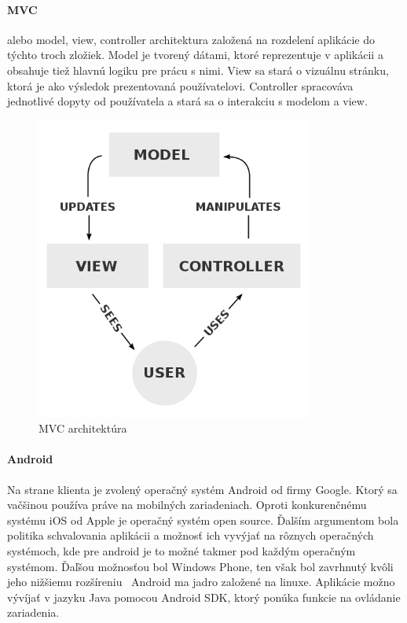 \paragraph{MVC} alebo model, view, controller architektura založená na rozdelení aplikácie do týchto troch zložiek. Model je tvorený dátami, ktoré reprezentuje v aplikácii a obsahuje tiež hlavnú logiku pre prácu s nimi. View sa stará o vizuálnu stránku, ktorá je ako výsledok prezentovaná používatelovi. Controller spracováva jednotlivé dopyty od používatela a stará sa o interakciu s modelom a view.
\begin{figure}[h]
  \centering
  \includegraphics[height=10cm]{mainmatter/imgs/mvc.png}
  \caption{MVC architektúra}
  \label{fig:comenius}
\end{figure}

\paragraph{Android} Na strane klienta je zvolený operačný systém Android od firmy Google. Ktorý sa vačšinou používa práve na mobilných zariadeniach. Oproti konkurenčnému systému iOS od Apple je operačný systém open source. Ďalším argumentom bola politika schvalovania aplikácii a možnosť ich vyvýjať na rôznych operačných systémoch, kde pre android je to možné takmer pod každým operačným systémom. Ďaľšou možnosťou bol Windows Phone, ten však bol zavrhnutý kvôli jeho nižšiemu rozšíreniu \
Android ma jadro založené na linuxe. Aplikácie možno vývíjať v jazyku Java pomocou Android SDK, ktorý ponúka funkcie na ovládanie zariadenia.


